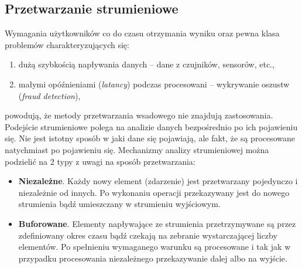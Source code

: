 
\subsection{Przetwarzanie strumieniowe}

Wymagania użytkowników co do czasu otrzymania wyniku
oraz pewna klasa problemów charakteryzujących się:
\begin{enumerate}
	\item dużą szybkością napływania danych -- dane z czujników, sensorów, etc.,
	\item małymi opóźnieniami (\textit{latancy}) podczas procesowani -- wykrywanie oszustw (\textit{fraud detection}),
\end{enumerate}
powodują,
że metody przetwarzania wsadowego nie znajdują zastosowania.
Podejście strumieniowe polega na analizie danych bezpośrednio po ich pojawieniu się.
Nie jest istotny sposób w jaki dane się pojawiają,
ale fakt,
że są procesowane natychmiast po pojawieniu się.
Mechanizmy analizy strumieniowej można podzielić na 2 typy z uwagi na sposób przetwarzania:
\begin{itemize}
	\item \textbf{Niezależne}.
	Każdy nowy element (zdarzenie) jest przetwarzany pojedynczo i niezależnie od innych.
	Po wykonaniu operacji przekazywany jest do nowego strumienia bądź umieszczany w strumieniu wyjściowym.
	\item \textbf{Buforowane}.
	Elementy napływające ze strumienia przetrzymywane są przez zdefiniowany okres czasu
	bądź czekają na zebranie wystarczającej liczby elementów.
	Po spełnieniu wymaganego warunku są procesowane
	i tak jak w przypadku procesowania niezależnego	przekazywanie dalej albo na wyjście.
\end{itemize}

